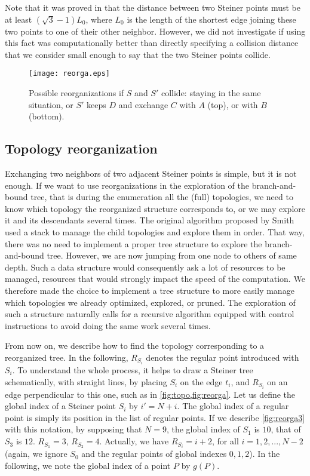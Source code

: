 \documentclass{article}
\theoremstyle{plain}
\begin{document}
Note that it was proved in \cite[paragraph 8.4]{Gilbert} that the distance between two Steiner points must be at least $(\sqrt{3}-1)L_0$, where $L_0$ is the length of the shortest edge joining these two points to one of their other neighbor. However, we did not investigate if using this fact was computationally better than directly specifying a collision distance that we consider small enough to say that the two Steiner points collide.


\begin{figure}
\begin{center}
\texttt{[image: reorga.eps]} 
\end{center}
\caption{Possible reorganizations if $S$ and $S'$ collide: staying in the same situation, or $S'$ keeps $D$ and exchange $C$ with $A$ (top), or with $B$ (bottom).\label{Fig2}}
\end{figure}






\subsection{Topology reorganization}
\label{sec:topreorga}
Exchanging two neighbors of two adjacent Steiner points is simple, but it is not enough. 
If we want to use reorganizations in the exploration of the \mbox{branch-and-bound} tree, that is during the enumeration all the (full) topologies, we need to know which topology the reorganized structure corresponds to, or we may explore it and its descendants several times.
The original algorithm proposed by Smith used a stack to manage the child topologies and explore them in order. 
That way, there was no need to implement a proper tree structure to explore the \mbox{branch-and-bound} tree. 
However, we are now jumping from one node to others of same depth. 
Such a data structure would consequently ask a lot of resources to be managed, resources that would strongly impact the speed of the computation. 
We therefore made the choice to implement a tree structure to more easily manage which topologies we already optimized, explored, or pruned. 
The exploration of such a structure naturally calls for a recursive algorithm equipped with control instructions to avoid doing the same work several times.

From now on, we describe how to find the topology corresponding to a reorganized tree. 
In the following, $R_{S_i}$ denotes the regular point introduced with $S_i$.
To understand the whole process, it helps to draw a Steiner tree schematically, with straight lines, by placing $S_i$ on the edge $t_i$, and $R_{S_i}$ on an edge perpendicular to this one, such as in \cref{fig:topo,fig:reorga}. 
Let us define the global index of a Steiner point $S_i$ by $i' = N+i$. 
The global index of a regular point is simply its position in the list of regular points. 
If we describe \cref{fig:reorga3} with this notation, by supposing that $N = 9$, the global index of $S_1$ is $10$, that of $S_3$ is $12$. 
$R_{S_1} = 3$, $R_{S_2} = 4$. 
Actually, we have $R_{S_i} = i + 2$, for all $i = 1,2,...,N-2$ (again, we ignore $S_0$ and the regular points of global indexes $0,1,2$). 
In the following, we note the global index of a point $P$ by $g(P)$.
\end{document}
